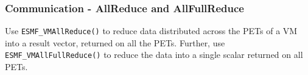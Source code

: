  
\setlength{\oldparskip}{\parskip}
\setlength{\parskip}{1.5ex}
\setlength{\oldparindent}{\parindent}
\setlength{\parindent}{0pt}
\setlength{\oldbaselineskip}{\baselineskip}
\setlength{\baselineskip}{11pt}
 
\def\bv{\begin{verbatim}}
\def\ev{\end{verbatim}}
\def\be{\begin{equation}}
\def\ee{\end{equation}}
\def\bea{\begin{eqnarray}}
\def\eea{\end{eqnarray}}
\def\bi{\begin{itemize}}
\def\ei{\end{itemize}}
\def\bn{\begin{enumerate}}
\def\en{\end{enumerate}}
\def\bd{\begin{description}}
\def\ed{\end{description}}
\def\({\left (}
\def\){\right )}
\def\[{\left [}
\def\]{\right ]}
\def\<{\left  \langle}
\def\>{\right \rangle}
\def\cI{{\cal I}}
\def\diag{\mathop{\rm diag}}
\def\tr{\mathop{\rm tr}}


 

  
   \subsubsection{Communication - AllReduce and AllFullReduce}
  
   Use {\tt ESMF\_VMAllReduce()} to reduce data distributed across the PETs of a 
   VM into a result vector, returned on all the PETs. Further, use
   {\tt ESMF\_VMAllFullReduce()} to reduce the data into a single scalar returned
   on all PETs.
   

